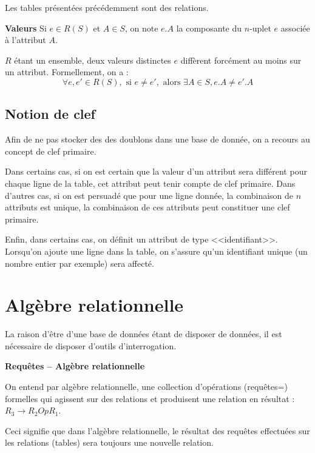 \documentclass[10pt]{article}
\begin{document}
\begin{exemple}
Les tables présentées précédemment sont des relations. 
\end{exemple}

\begin{defi}
\textbf{Valeurs}
Si $e\in R(S)$ et $A\in S$, on note $e.A$ la composante du $n$-uplet $e$ associée à l'attribut $A$. 

$R$ étant un ensemble, deux valeurs distinctes $e$ diffèrent forcément au moins sur un attribut.  Formellement, on a : 
$$
\forall e,e' \in R(S), \text{ si } e\neq e', \text{ alors } \exists A \in S, e.A \neq e'.A
$$

\end{defi}

\subsection{Notion de clef}
Afin de ne pas stocker des des doublons dans une base de donnée, on a recours au concept de clef primaire. 

Dans certains cas, si on est certain que la valeur d'un attribut sera différent pour chaque ligne de la table, cet attribut peut tenir compte de clef primaire. Dans d'autres cas, si on est persuadé que pour une ligne donnée, la combinaison de $n$ attributs est unique, la combinaison de ces attributs peut constituer une clef primaire. 

Enfin, dans certains cas, on définit un attribut de type <<identifiant>>. Lorsqu'on ajoute une ligne dans la table, on s'assure qu'un identifiant unique (un nombre entier par exemple) sera affecté.


\section{Algèbre relationnelle}
La raison d'être d'une base de données étant de disposer de données, il est nécessaire de disposer d'outils d'interrogation. 

\begin{defi}
\textbf{Requêtes -- Algèbre relationnelle}

On entend par algèbre relationnelle, une collection d'opérations (requêtes=) formelles qui agissent sur des relations et produisent une relation en résultat : $R_3 \rightarrow R_2 Op R_1$.
\end{defi}

Ceci signifie que dans l'algèbre relationnelle, le résultat des requêtes effectuées sur les relations (tables) sera toujours une nouvelle relation. 
\end{document}
